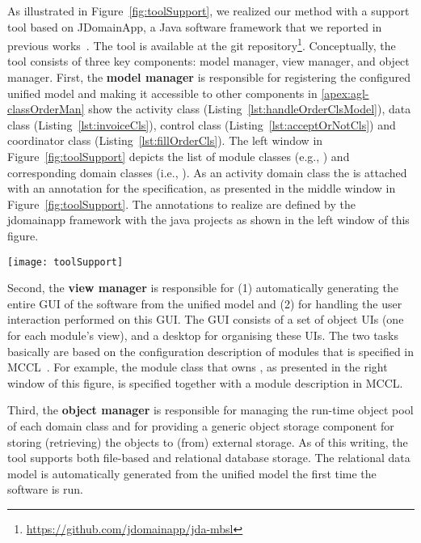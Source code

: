 As illustrated in Figure~\ref{fig:toolSupport}, we realized our method with a support tool based on JDomainApp, a Java software framework that we reported in previous works~\cite{le_domain_2018}. The tool is available at the git repository\footnote{\url{https://github.com/jdomainapp/jda-mbsl}}. %
%
Conceptually, the tool consists of three key components: model manager, view manager, and object manager. First, the \textbf{model manager} is responsible for registering the configured unified model and making it accessible to other components 
%
in \ref{apex:agl-classOrderMan} show the activity class  (Listing~\ref{lst:handleOrderClsModel}), data class  (Listing~\ref{lst:invoiceCls}), control class  (Listing~\ref{lst:acceptOrNotCls}) and coordinator class  (Listing~\ref{lst:fillOrderCls}).
%
The left window in Figure~\ref{fig:toolSupport} depicts the list of module classes (e.g., ) and corresponding domain classes (i.e., ). As an activity domain class the  is attached with an annotation  for the \agl specification, as presented in the middle window in Figure~\ref{fig:toolSupport}. The annotations to realize \agl are defined by the jdomainapp framework with the java projects as shown in the left window of this figure. 

\begin{figure*}[ht]
	\centering
	\texttt{[image: toolSupport]}
	\caption{Illustration for the JDomainApp-based realization and usability of \agl.} %
	\label{fig:toolSupport}
\end{figure*}

Second, the \textbf{view manager} is responsible for (1) automatically generating the entire GUI of the software from the unified model and (2) for handling the user interaction performed on this GUI. The GUI consists of a set of object UIs (one for each module's view), and a desktop for organising these UIs. The two tasks basically are based on the configuration description of modules that is specified in MCCL~\cite{le_domain_2018}. For example, the module class  that owns , as presented in the right window of this figure, is specified together with a module description in MCCL.

Third, the \textbf{object manager} is responsible for managing the run-time object pool of each domain class and for providing a generic object storage component for storing (retrieving) the objects to (from) external storage. As of this writing, the tool supports both file-based and relational database storage. The relational data model is automatically generated from the unified model the first time the software is run.

